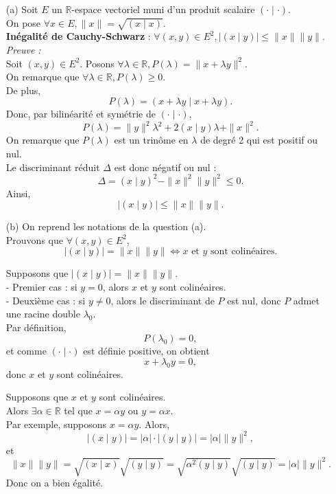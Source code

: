 \documentclass[a4paper,12pt,oneside]{book}
\newenvironment{solution}{\begin{solutionbox}}{\end{solutionbox}}
\begin{document}
	\begin{solution}
		\begin{enumerate}
			\item[(a)] Soit \( E \) un \(\mathbb{R}\)-espace vectoriel muni d’un produit scalaire \(( \cdot \mid \cdot )\).\\
			On pose \(\forall x \in E, \|x\| = \sqrt{(x \mid x)}\).\\
			\textbf{Inégalité de Cauchy-Schwarz} : \(\forall (x,y) \in E^2, |(x \mid y)| \leq \|x\|\|y\|\).\\
			\textit{Preuve :}\\
			Soit \((x,y) \in E^2\). Posons \(\forall \lambda \in \mathbb{R}, P(\lambda) = \|x + \lambda y\|^2\).\\
			On remarque que \(\forall \lambda \in \mathbb{R}, P(\lambda) \geq 0\).\\
			De plus,
			\[
			P(\lambda) = (x + \lambda y \mid x + \lambda y).
			\]
			Donc, par bilinéarité et symétrie de \(( \cdot \mid \cdot )\),
			\[
			P(\lambda) = \|y\|^2 \lambda^2 + 2 (x \mid y) \lambda + \|x\|^2.
			\]
			On remarque que \(P(\lambda)\) est un trinôme en \(\lambda\) de degré 2 qui est positif ou nul.\\
			Le discriminant réduit \(\Delta\) est donc négatif ou nul :
			\[
			\Delta = (x \mid y)^2 - \|x\|^2 \|y\|^2 \leq 0.
			\]
			Ainsi,
			\[
			|(x \mid y)| \leq \|x\| \|y\|.
			\]
			
			\item[(b)] On reprend les notations de la question (a).\\
			Prouvons que \(\forall (x,y) \in E^2\),
			\[
			|(x \mid y)| = \|x\| \|y\| \iff x \text{ et } y \text{ sont colinéaires}.
			\]
			
			Supposons que \(|(x \mid y)| = \|x\| \|y\|\).\\
			- Premier cas : si \(y = 0\), alors \(x\) et \(y\) sont colinéaires.\\
			- Deuxième cas : si \(y \neq 0\), alors le discriminant de \(P\) est nul, donc \(P\) admet une racine double \(\lambda_0\).\\
			Par définition,
			\[
			P(\lambda_0) = 0,
			\]
			et comme \(( \cdot \mid \cdot )\) est définie positive, on obtient
			\[
			x + \lambda_0 y = 0,
			\]
			donc \(x\) et \(y\) sont colinéaires.
			
			Supposons que \(x\) et \(y\) sont colinéaires.\\
			Alors \(\exists \alpha \in \mathbb{R}\) tel que \(x = \alpha y\) ou \(y = \alpha x\).\\
			Par exemple, supposons \(x = \alpha y\). Alors,
			\[
			|(x \mid y)| = |\alpha| \cdot |(y \mid y)| = |\alpha| \|y\|^2,
			\]
			et
			\[
			\|x\| \|y\| = \sqrt{(x \mid x)} \sqrt{(y \mid y)} = \sqrt{\alpha^2 (y \mid y)} \sqrt{(y \mid y)} = |\alpha| \|y\|^2.
			\]
			Donc on a bien égalité.
			

\end{enumerate}
\end{solution}
\end{document}
